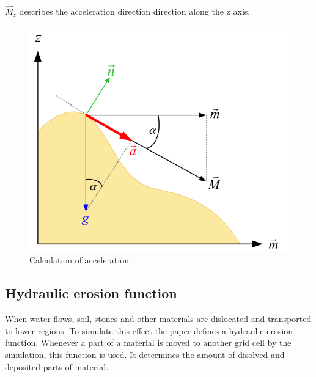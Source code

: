 $\vec{M}_z$ describes the acceleration direction direction along the z axis.

\begin{figure}[htb]
	\centering
	\includegraphics[width=.8\linewidth]{NWD05/acceleration}
	\caption{Calculation of acceleration.}
	\label{fig:calc_acceleration}
\end{figure}

\subsection{Hydraulic erosion function}
When water flows, soil, stones and other materials are dislocated and transported to lower regions. To simulate this effect the paper defines a hydraulic erosion function. Whenever a part of a material is moved to another grid cell by the simulation, this function is used. It determines the amount of disolved and deposited parts of material. 